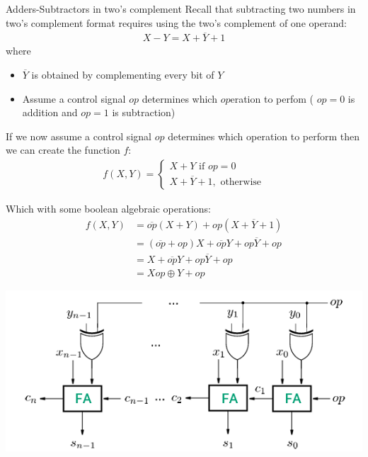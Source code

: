\begin{parag}{Adders-Subtractors in two's complement}
    Recall that subtracting two numbers in two's complement format requires using the two's complement of one operand:
    \begin{align*}
        X - Y = X + \overline{Y} + 1
    \end{align*}
    where 
    \begin{itemize}
        \item $ \overline{Y}$ is obtained by complementing every bit of $Y$
        \item Assume a control signal $op$ determines which $op$eration to perfom ( $op = 0$ is addition and $op = 1$ is subtraction)
    \end{itemize}
If we now assume a control signal $op$ determines which operation to perform then we can create the function $f$:
\begin{align*}
    f ( X, Y) = \begin{cases}
        X + Y \text{ if } op = 0\\
        X + \overline{Y} + 1, \text{ otherwise}
    \end{cases}
\end{align*}

Which with some  boolean algebraic operations:
\begin{align*}
    f(X, Y) &= \overline{op}(X + Y) + op(X + \overline{Y} + 1) \\
            &= ( \overline{op} + op) X + \overline{op}Y + op \overline{Y} + op \\
            &= X + \overline{op}Y + op \overline{Y} + op \\
            &= X op \oplus Y + op
\end{align*}

\begin{center}
    \includegraphics[scale=0.7]{62025-03-14.png}
    
\end{center}


\end{parag}

